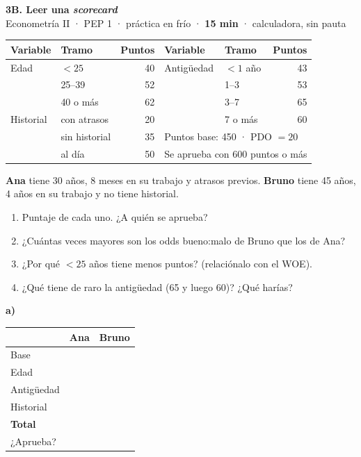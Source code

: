\documentclass[11pt,a4paper]{article}
\begin{document}
\begin{center}
{\Large\bfseries 3B. Leer una \emph{scorecard}}\\[2pt]
Econometría II · PEP 1 · práctica en frío · \textbf{15 min} · calculadora, sin pauta
\end{center}

\begin{center}
\renewcommand{\arraystretch}{1.3}
\begin{tabular}{llr|llr}\toprule
Variable & Tramo & Puntos & Variable & Tramo & Puntos\\\midrule
Edad & $<25$ & 40 & Antigüedad & $<1$ año & 43\\
 & 25--39 & 52 & & 1--3 & 53\\
 & 40 o más & 62 & & 3--7 & 65\\
Historial & con atrasos & 20 & & 7 o más & 60\\
 & sin historial & 35 & \multicolumn{3}{l}{Puntos base: 450 · PDO $=20$}\\
 & al día & 50 & \multicolumn{3}{l}{Se aprueba con 600 puntos o más}\\\bottomrule
\end{tabular}
\end{center}

\noindent\textbf{Ana} tiene 30 años, 8 meses en su trabajo y atrasos previos. \textbf{Bruno} tiene 45 años, 4 años en su trabajo y no tiene historial.

\begin{enumerate}[label=\alph*),itemsep=2pt]
\item Puntaje de cada uno. ¿A quién se aprueba?
\item ¿Cuántas veces mayores son los odds bueno:malo de Bruno que los de Ana?
\item ¿Por qué $<25$ años tiene menos puntos? (relaciónalo con el WOE).
\item ¿Qué tiene de raro la antigüedad (65 y luego 60)? ¿Qué harías?
\end{enumerate}

\bigskip
\noindent\textbf{a)}
\begin{center}
\renewcommand{\arraystretch}{1.8}
\begin{tabular}{|l|p{3.2cm}|p{3.2cm}|}\hline
 & \centering Ana & \centering\arraybackslash Bruno\\\hline
Base & & \\\hline
Edad & & \\\hline
Antigüedad & & \\\hline
Historial & & \\\hline
\textbf{Total} & & \\\hline
¿Aprueba? & & \\\hline
\end{tabular}
\end{center}
\end{document}
